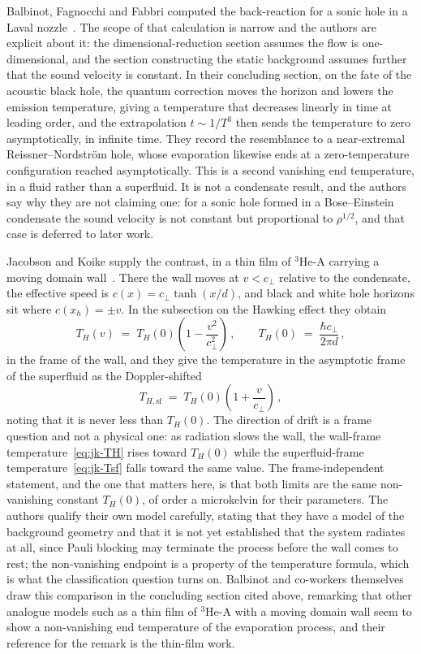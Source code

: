 \documentclass[aps,prd,nofootinbib,superscriptaddress,12pt]{revtex4-2}
\begin{document}
Balbinot, Fagnocchi and Fabbri computed the back-reaction for a sonic hole in a
Laval nozzle~\cite{Balbinot2005PRD}. The scope of that calculation is narrow
and the authors are explicit about it: the dimensional-reduction section
assumes the flow is one-dimensional, and the section constructing the static
background assumes further that the sound velocity is constant. In their
concluding section, on the fate of the acoustic black hole, the quantum
correction moves the horizon and lowers the emission temperature, giving a
temperature that decreases linearly in time at leading order, and the
extrapolation $t \sim 1/T^3$ then sends the temperature to zero
asymptotically, in infinite time. They record the resemblance to a
near-extremal Reissner--Nordstr\"om hole, whose evaporation likewise ends at a
zero-temperature configuration reached asymptotically. This is a second
vanishing end temperature, in a fluid rather than a superfluid. It is not a
condensate result, and the authors say why they are not claiming one: for a
sonic hole formed in a Bose--Einstein condensate the sound velocity is not
constant but proportional to $\rho^{1/2}$, and that case is deferred to later
work.

Jacobson and Koike supply the contrast, in a thin film of $^{3}$He-A carrying a
moving domain wall~\cite{JacobsonKoike2002}. There the wall moves at
$v < c_\perp$ relative to the condensate, the effective speed is $c(x) =
c_\perp \tanh(x/d)$, and black and white hole horizons sit where $c(x_h) = \pm
v$. In the subsection on the Hawking effect they obtain
\begin{equation}
\label{eq:jk-TH}
T_H(v) \;=\; T_H(0)\left(1 - \frac{v^2}{c_\perp^2}\right)\,,
\qquad
T_H(0) \;=\; \frac{\hbar c_\perp}{2\pi d}\,,
\end{equation}
in the frame of the wall, and they give the temperature in the asymptotic frame
of the superfluid as the Doppler-shifted
\begin{equation}
\label{eq:jk-Tsf}
T_{H,\mathrm{sf}} \;=\; T_H(0)\left(1 + \frac{v}{c_\perp}\right)\,,
\end{equation}
noting that it is never less than $T_H(0)$. The direction of drift is a frame
question and not a physical one: as radiation slows the wall, the wall-frame
temperature~\eqref{eq:jk-TH} rises toward $T_H(0)$ while the superfluid-frame
temperature~\eqref{eq:jk-Tsf} falls toward the same value. The frame-independent
statement, and the one that matters here, is that both limits are the same
non-vanishing constant $T_H(0)$, of order a microkelvin for their parameters.
The authors qualify their own model carefully, stating that they have a model
of the background geometry and that it is not yet established that the system
radiates at all, since Pauli blocking may terminate the process before the wall
comes to rest; the non-vanishing endpoint is a property of the temperature
formula, which is what the classification question turns on. Balbinot and
co-workers themselves draw this comparison in the concluding section cited
above, remarking that other analogue models such as a thin film of $^{3}$He-A
with a moving domain wall seem to show a non-vanishing end temperature of the
evaporation process, and their reference for the remark is the thin-film work.
\end{document}
